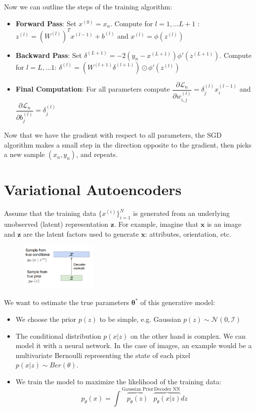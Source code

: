 \documentclass[twoside]{article}
\begin{document}
Now we can outline the steps of the training algorithm:
\begin{itemize}
\item \textbf{Forward Pass}: Set $x^{(0)} = x_{n}$. Compute for $l = 1, \ldots  L+1$ :    $z^{(l)} = (W^{(l)})^T x^{(l-1)} + b^{(l)}$ and  $x^{(l)} = \phi(z^{(l)})$
\item \textbf{Backward Pass}: Set $\delta^{(L+1)} = -2(y_{n} - x^{(L+1)})\phi'(z^{(L+1)})$. Compute for
$l = L, \ldots 1$:  $\delta^{(l)} = (W^{(l+1)}\delta^{(l+1)}) \odot \phi'(z^{(l)})$

\item \textbf{Final Computation}: For all parameters compute $\dfrac{\partial \mathcal{L}_{n} }{\partial w^{(l)}_{i,j}} = \delta^{(l)}_{j}  x_{i}^{(l-1)}$ and $\dfrac{\partial \mathcal{L}_{n} }{\partial b^{(l)}_{j}} = \delta^{(l)}_{j}$
\end{itemize}






Now that we have the gradient with respect to all parameters, the SGD algorithm makes a small step in the direction
opposite to the gradient, then picks a new sample $(x_{n}, y_{n})$,
and repeats.


\section{Variational Autoencoders}

Assume that the training data $\{x^{(i)}\}_{i=1}^{N}$ is generated from an underlying unobserved (latent)
representation $\mathbf{z}$. For example, imagine that
$\mathbf{x}$ is an image and $\mathbf{z}$ are the latent factors used to
generate $\mathbf{x}$: attributes, orientation, etc. \\

\begin{figure}[h]
\centering
\includegraphics[width=0.33\textwidth]{img/vae_1.png}
\end{figure}

 We want to estimate the true parameters $\mathbf{\theta}^*$
of this generative model:

\begin{itemize}
    \item We choose the  prior ${p(z)}$ to be simple, e.g. Gaussian $p(z) \sim \mathcal{N}(0,\mathcal{I})$
    \item The conditional distribution $p(x|z)$ on the other hand is complex. We can model it with a neural network. In the case of images, an example would be a multivariate Bernoulli representing the state of each pixel $p(x|z) \sim Ber(\theta)$.
    \item We train the model to maximize the likelihood of the training data: $$p_{\theta}(x)= \int \overbrace{p_{\theta}(z)}^\text{Gaussian Prior}\overbrace{p_{\theta}(x|z)}^\text{Decoder NN}dz$$
\end{itemize}
\end{document}
